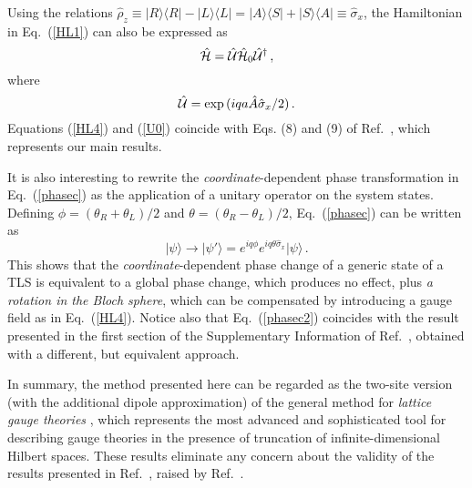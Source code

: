 \documentclass[aps,pra,reprint, superscriptaddress,amsmath,showpacs,longbibliography]{revtex4-2}
\renewcommand{\eqref}[1]{\mbox{Eq.~(\ref{#1})}}
\newcommand{\be}{\begin{equation}}
\newcommand{\ee}{\end{equation}}
\begin{document}
Using  the relations $\hat \rho_z \equiv | R \rangle \langle R| - |L \rangle \langle L| = |A \rangle \langle S| + |S \rangle \langle A|\equiv \hat \sigma_x$,
the Hamiltonian in \eqref{HL1} can also be expressed as
\be\label{HL4}
\hat{\cal H} = \hat {\cal U} \hat {\cal H}_0 \hat {\cal U}^\dag\, ,
\ee
where 
\be\label{U0}
 \hat {\cal U} = \exp{(i q a \hat A \hat \sigma_x/2)}\, .
\ee
Equations (\ref{HL4}) and (\ref{U0}) coincide with Eqs. (8) and (9) of Ref.~\cite{DiStefano2019}, which represents 
our main results. 

It is also interesting to rewrite the {\em coordinate}-dependent phase transformation in \eqref{phasec} as the application of a unitary operator on the system states. Defining $\phi = (\theta_R + \theta_L)/2$ and $\theta = (\theta_R - \theta_L)/2$, \eqref{phasec} can be written as 
\be\label{phasec2}
| \psi \rangle \to | \psi' \rangle = e^{i q \phi} e^{i q \theta \hat \sigma_x} | \psi \rangle\, .
\ee
This shows that the {\em coordinate}-dependent phase change of a generic state of a {TLS} is equivalent to a global phase change, which produces no effect, plus {\em a rotation in the Bloch sphere}, which can be compensated by  introducing a gauge field as in \eqref{HL4}.
Notice {also} that {\eqref{phasec2} coincides} with the result presented in the first section of the  {Supplementary Information of Ref.~\cite{DiStefano2019}}, obtained with a different, but equivalent approach.
\vspace{0.4 cm}

In summary, the method {presented here} can be regarded as the two-site version (with the additional dipole approximation) of the general method for {\em lattice gauge theories} \cite{Wiese2013}, which represents the most advanced and {sophisticated} tool for describing gauge theories in the presence of truncation of infinite-dimensional Hilbert spaces.
These results eliminate any concern about the validity of the results presented in Ref.~\cite{DiStefano2019}, raised 
by Ref.~\cite{Stokes2020a}.
\end{document}
